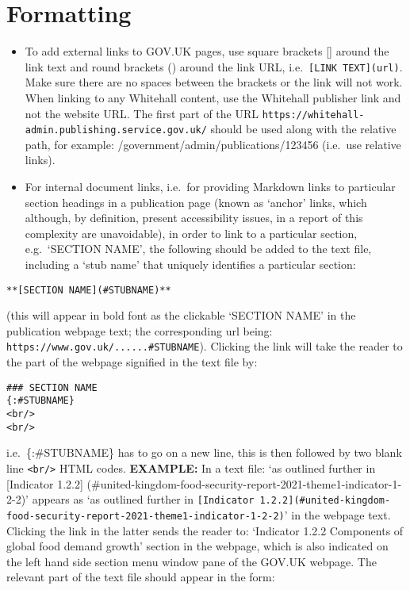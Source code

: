\documentclass[
]{book}
\begin{document}
\hypertarget{formatting}{%
\section{Formatting}\label{formatting}}

\begin{itemize}
\item
  To add external links to GOV.UK pages, use square brackets {[}{]} around the link text and round brackets () around the link URL, i.e.~\texttt{{[}LINK\ TEXT{]}(url)}. Make sure there are no spaces between the brackets or the link will not work. When linking to any Whitehall content, use the Whitehall publisher link and not the website URL. The first part of the URL \texttt{https://whitehall-admin.publishing.service.gov.uk/} should be used along with the relative path, for example: /government/admin/publications/123456 (i.e.~use relative links).
\item
  For internal document links, i.e.~for providing Markdown links to particular section headings in a publication page (known as `anchor' links, which although, by definition, present accessibility issues, in a report of this complexity are unavoidable), in order to link to a particular section, e.g.~`SECTION NAME', the following should be added to the text file, including a `stub name' that uniquely identifies a particular section:
\end{itemize}

\begin{verbatim}
**[SECTION NAME](#STUBNAME)** 
\end{verbatim}

(this will appear in bold font as the clickable `SECTION NAME' in the publication webpage text; the corresponding url being: \texttt{https://www.gov.uk/......\#STUBNAME}). Clicking the link will take the reader to the part of the webpage signified in the text file by:

\begin{verbatim}
### SECTION NAME
{:#STUBNAME}
<br/>
<br/>
\end{verbatim}

i.e.~\{:\#STUBNAME\} has to go on a new line, this is then followed by two blank line \texttt{\textless{}br/\textgreater{}} HTML codes.
\textbf{EXAMPLE:}
In a text file: `as outlined further in {[}Indicator 1.2.2{]} (\#united-kingdom-food-security-report-2021-theme1-indicator-1-2-2)' appears as `as outlined further in \texttt{{[}Indicator\ 1.2.2{]}(\#united-kingdom-food-security-report-2021-theme1-indicator-1-2-2)}' in the webpage text. Clicking the link in the latter sends the reader to: `Indicator 1.2.2 Components of global food demand growth' section in the webpage, which is also indicated on the left hand side section menu window pane of the GOV.UK webpage. The relevant part of the text file should appear in the form:
\end{document}
